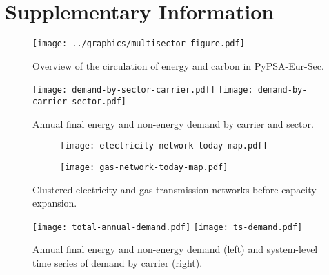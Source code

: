 
\section*{Supplementary Information}
\label{sec:si}
\normalsize

\begin{figure}[ht!]
    \centering
    \texttt{[image: ../graphics/multisector\_figure.pdf]}
    \caption{Overview of the circulation of energy and carbon in PyPSA-Eur-Sec.}
    \label{fig:multisector}
\end{figure}

\begin{figure}[ht!]
    \centering
    \texttt{[image: demand-by-sector-carrier.pdf]}
    \texttt{[image: demand-by-carrier-sector.pdf]}
    \caption{Annual final energy and non-energy demand by carrier and sector.}
    \label{fig:demand-by-sector-carrier}
\end{figure}

\begin{figure}[ht!]
    \centering
\begin{subfigure}[t]{0.49\textwidth}
    \centering
    \texttt{[image: electricity-network-today-map.pdf]}
\end{subfigure}
\begin{subfigure}[t]{0.49\textwidth}
    \centering
    \texttt{[image: gas-network-today-map.pdf]}
\end{subfigure}
\caption{Clustered electricity and gas transmission networks before capacity expansion.}
\label{fig:clustered-networks}
\end{figure}

\begin{figure}[ht!]
    \centering
    \texttt{[image: total-annual-demand.pdf]}
    \texttt{[image: ts-demand.pdf]}
    \caption{Annual final energy and non-energy demand (left) and system-level time series of demand by carrier (right).}
    \label{fig:demand-time}
\end{figure}

